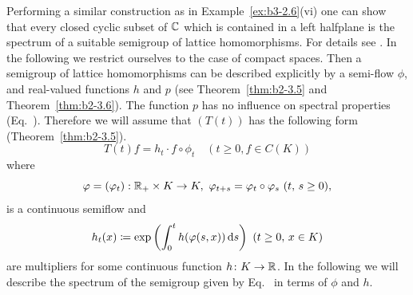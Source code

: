 Performing a similar construction as in Example~\ref{ex:b3-2.6}(vi) one can show that every closed cyclic subset of\/ $\mathbb{C}$  which is contained in a left halfplane is the spectrum of a suitable semigroup of lattice homomorphisms. 
For details see \textcite{derndingernagel:1979}. 
In the following we restrict ourselves to the case of compact spaces. 
Then a semigroup of lattice homomorphisms can be described explicitly by a semi-flow $\phi$, and real-valued functions $h$ and $p$ (see Theorem~\ref{thm:b2-3.5} and Theorem~\ref{thm:b2-3.6}). 
The function $p$ has no influence on spectral properties (\cf Eq.~). 
Therefore we will assume that $(T(t))$ has the following form (\cf Theorem~\ref{thm:b2-3.5}). 
\begin{equation}\label{eq:b3-4.1}
	T(t)f = h_{t}\cdot f\circ\phi_{t} \quad (t \geq 0, f \in C(K)) 
\end{equation}
where 
\[
\phi = (\phi_{t}): \R_{+} \times K \to K , \ \phi_{t+s}
=\phi_{t}\circ\phi_{s}  
\ (t,\,s \geq 0) , 
\]
is a continuous semiflow and 
\[
h_{t}(x) \coloneq \exp\left(\int_{0}^{t} h(\phi(s,x)) \ds\right)\ (t \geq 0,\, x \in K)
\]
are multipliers for some continuous function $h \colon K \to \mathbb{R}$.
In the following we will describe the spectrum of the semigroup given by Eq.~ in terms of\/ $\phi$ and $h$.

